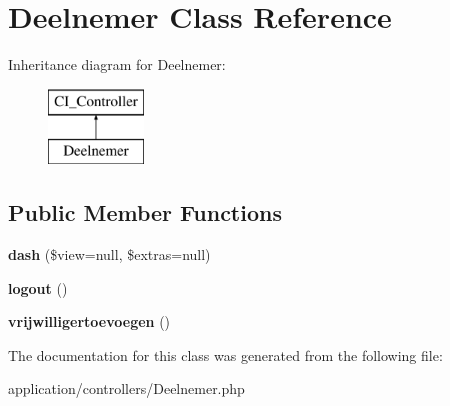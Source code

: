 \hypertarget{class_deelnemer}{}\section{Deelnemer Class Reference}
\label{class_deelnemer}
Inheritance diagram for Deelnemer\+:\begin{figure}[H]
\begin{center}
\leavevmode
\includegraphics[height=2.000000cm]{class_deelnemer}
\end{center}
\end{figure}
\subsection*{Public Member Functions}
\begin{DoxyCompactItemize}
\item 
\mbox{\label{class_deelnemer_a35f5125b52883ea70807c42282f60b54}} 
{\bfseries dash} (\$view=null, \$extras=null)
\item 
\mbox{\label{class_deelnemer_a082405d89acd6835c3a7c7a08a7adbab}} 
{\bfseries logout} ()
\item 
\mbox{\label{class_deelnemer_a4ad528eb297f8dc0084b986f58fe2d2c}} 
{\bfseries vrijwilligertoevoegen} ()
\end{DoxyCompactItemize}


The documentation for this class was generated from the following file\+:\begin{DoxyCompactItemize}
\item 
application/controllers/Deelnemer.\+php\end{DoxyCompactItemize}
